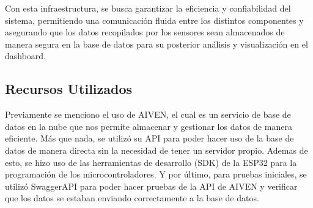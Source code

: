 \begin{center}
{}
\label{fig:infraestructura}
\end{center}

Con esta infraestructura, se busca garantizar la eficiencia y confiabilidad del sistema, permitiendo una comunicación fluida entre los distintos componentes y asegurando que los datos recopilados por los sensores sean almacenados de manera segura en la base de datos para su posterior análisis y visualización en el dashboard.

\subsection{Recursos Utilizados}
Previamente se menciono el uso de AIVEN, el cual es un servicio de base de datos en la nube que nos permite almacenar y gestionar los datos de manera eficiente. Más que nada, se utilizó su API para poder hacer uso de la base de datos de manera directa sin la necesidad de tener un servidor propio. Ademas de esto, se hizo uso de las herramientas de desarrollo (SDK) de la ESP32 para la programación de los microcontroladores. Y por último, para pruebas iniciales, se utilizó SwaggerAPI para poder hacer pruebas de la API de AIVEN y verificar que los datos se estaban enviando correctamente a la base de datos.